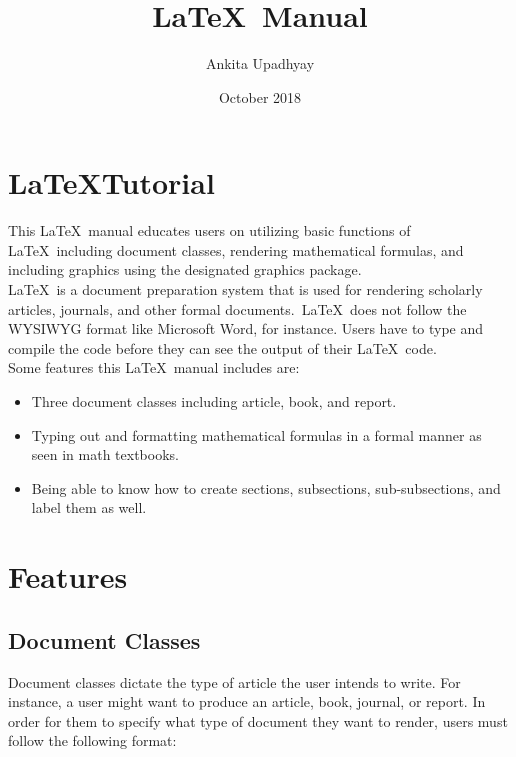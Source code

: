 \documentclass[11pt,twocolumn]{article}
\title{\LaTeX\ Manual}
\author{Ankita Upadhyay }
\date{October 2018}
\begin{document}
\maketitle

\section{\LaTeX Tutorial} 
 
This \LaTeX\ manual educates users on utilizing basic functions of \LaTeX\ including document classes, rendering mathematical formulas, and including graphics using the designated graphics package.
\\
 
\LaTeX\ is a document preparation system that is used for rendering scholarly articles, journals, and other formal documents.\ \LaTeX\ does not follow the WYSIWYG format like Microsoft Word, for instance.
Users have to type and compile the code before they can see the output of their \LaTeX\ code.
\\
 
Some features this \LaTeX\ manual includes are: 
 
\begin{itemize}
  \item Three document classes including article, book, and report. 
  \item Typing out and formatting mathematical formulas in a formal manner as seen in math textbooks.
  \item Being able to know how to create sections, subsections, sub-subsections, and label them as well.
\end{itemize}

\section{Features}

\subsection{Document Classes}

Document classes dictate the type of article the user intends to write. For instance, a user might want to produce an article, book, journal, or report. In order for them to specify what type of document they want to render, users must follow the following format:

\thinspace
{}
\thinspace
\end{document}
